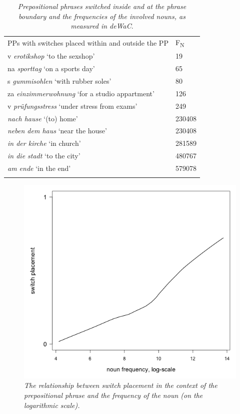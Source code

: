 \begin{table}
\begin{tabularx}{\textwidth}{L{9cm} R{2.5cm}}
		\midrule
		\addlinespace[2mm]
		PPs with switches placed within and outside the PP & F\textsubscript{\footnotesize{N}}\\
		\addlinespace[2mm] \midrule
		\addlinespace[2mm]
			v \textit{erotikshop} `to the sexshop' & 19\\
			na \textit{sporttag} `on a sports day' & 65\\
			s \textit{gummisohlen} `with rubber soles' & 80\\
			za \textit{einzimmerwohnung} `for a studio appartment' & 126\\
			v \textit{prüfungsstress} `under stress from exams' & 249\\
			\addlinespace[4mm]
			\hline
			\addlinespace[4mm]
			\textit{nach hause} `(to) home' & 230408\\
			\textit{neben dem haus} `near the house' & 230408\\
			\textit{in der kirche} `in church' & 281589\\
			\textit{in die stadt} `to the city' & 480767\\
			\textit{am ende} `in the end' & 579078\\
		\addlinespace[2mm]
		\midrule
	\end{tabularx}
	\caption{\textit{Prepositional phrases switched inside and at the phrase boundary and the frequencies of the involved nouns, as measured in deWaC}.}\label{tab:5:4}
\end{table}

\begin{figure}
	\centering
	    	\includegraphics[scale=0.5]{figures/5-Figure_3.png}	
		\caption{\textit{The relationship between switch placement in the context of the prepositional phrase and the frequency of the noun (on the logarithmic scale).}}
	\label{fig:5:3}
\end{figure}

